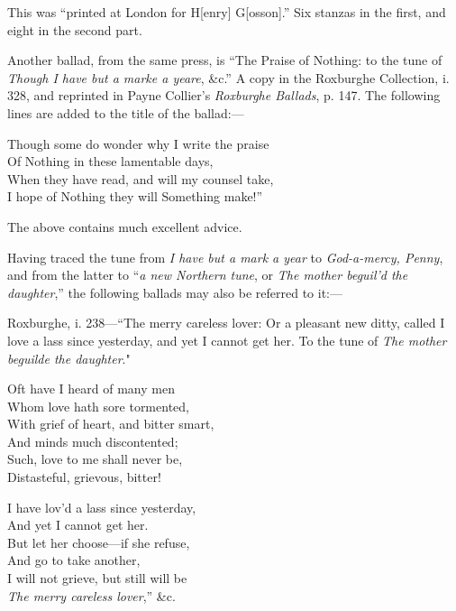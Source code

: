 This was “printed at London for H[enry] G[osson].” Six stanzas in the
first, and eight in the second part.

Another ballad, from the same press, is “The Praise of Nothing: to the tune
of \textit{Though I have but a marke a yeare}, \&c.” A copy in the Roxburghe Collection,
i. 328, and reprinted in Payne Collier’s \textit{Roxburghe Ballads}, p. 147. The
following lines are added to the title of the ballad:—
\settowidth{\versewidth}{Though some do wonder why I write the praise}
\begin{scverse}
Though some do wonder why I write the praise\\
Of Nothing in these lamentable days,\\
When they have read, and will my counsel take,\\
I hope of Nothing they will Something make!”
\end{scverse}

The above contains much excellent advice.

Having traced the tune from \textit{I have but a mark a year} to \textit{God-a-mercy, Penny},
and from the latter to “\textit{a new Northern tune}, or \textit{The mother beguil’d the daughter},”
the following ballads may also be referred to it:—

Roxburghe, i. 238—“The merry careless lover: Or a pleasant new ditty, called
I love a lass since yesterday, and yet I cannot get her. To the tune of \textit{The
mother beguilde the daughter}."
\settowidth{\versewidth}{Oft have I heard of many men}
\begin{dcverse}\begin{altverse}
Oft have I heard of many men\\
Whom love hath sore tormented,\\
With grief of heart, and bitter smart,\\
And minds much discontented;\\
Such, love to me shall never be,\\
Distasteful, grievous, bitter!
\end{altverse}

\begin{altverse}
I have lov’d a lass since yesterday,\\
And yet I cannot get her.\\
But let her choose—if she refuse,\\
And go to take another,\\
I will not grieve, but still will be\\
\textit{The merry careless lover},” \&c.
\end{altverse}
\end{dcverse}

